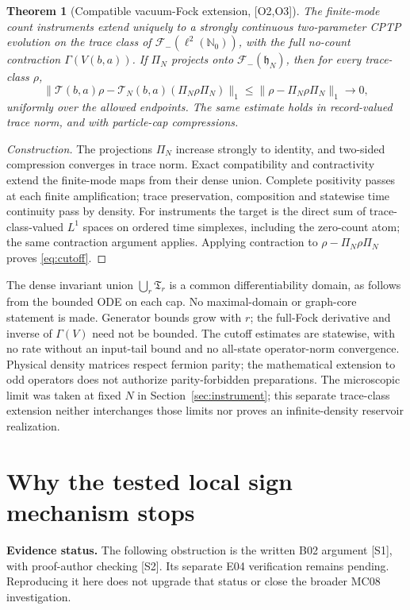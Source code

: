 \documentclass[11pt,letterpaper]{article}
\numberwithin{equation}{section}
\newtheorem{theorem}{Theorem}[section]
\theoremstyle{remark}
\newcommand{\N}{\mathbb N}
\newcommand{\ev}[1]{\textsf{[#1]}}
\newcommand{\Fock}{\mathcal F_-}
\begin{document}
\begin{theorem}[Compatible vacuum-Fock extension, \ev{O2,O3}]
The finite-mode count instruments extend uniquely to a strongly
continuous two-parameter CPTP evolution on the trace class of
$\Fock(\ell^2(\N_0))$, with the full no-count contraction
$\Gamma(V(b,a))$. If $\Pi_N$ projects onto $\Fock(\mathfrak h_N)$,
then for every trace-class $\rho$,
\begin{equation}
 \|\mathcal T(b,a)\rho-
 \mathcal T_N(b,a)(\Pi_N\rho\Pi_N)\|_1
 \le\|\rho-\Pi_N\rho\Pi_N\|_1\longrightarrow0, \label{eq:cutoff}
\end{equation}
uniformly over the allowed endpoints. The same estimate holds in
record-valued trace norm, and with particle-cap compressions.
\end{theorem}
\begin{proof}[Construction]
The projections $\Pi_N$ increase strongly to identity, and two-sided
compression converges in trace norm. Exact compatibility and
contractivity extend the finite-mode maps from their dense union.
Complete positivity passes at each finite amplification; trace
preservation, composition and statewise time continuity pass by density.
For instruments the target is the direct sum of trace-class-valued
$L^1$ spaces on ordered time simplexes, including the zero-count atom;
the same contraction argument applies. Applying contraction to
$\rho-\Pi_N\rho\Pi_N$ proves \eqref{eq:cutoff}.
\end{proof}

The dense invariant union $\bigcup_r\mathfrak T_r$ is a common
differentiability domain, as follows from the bounded ODE on each cap.
No maximal-domain or graph-core statement is made. Generator bounds
grow with $r$; the full-Fock derivative and inverse of $\Gamma(V)$
need not be bounded. The cutoff estimates are statewise, with no rate
without an input-tail bound and no all-state operator-norm convergence.
Physical density matrices respect fermion parity; the mathematical
extension to odd operators does not authorize parity-forbidden
preparations. The microscopic limit was taken at fixed $N$ in
Section~\ref{sec:instrument}; this separate trace-class extension
neither interchanges those limits nor proves an infinite-density
reservoir realization.

\section{Why the tested local sign mechanism stops}
\label{sec:cone}
\noindent\textbf{Evidence status.} The following obstruction is the
written B02 argument \ev{S1}, with proof-author checking \ev{S2}.
Its separate E04 verification remains pending. Reproducing it here does
not upgrade that status or close the broader MC08 investigation.
\end{document}
